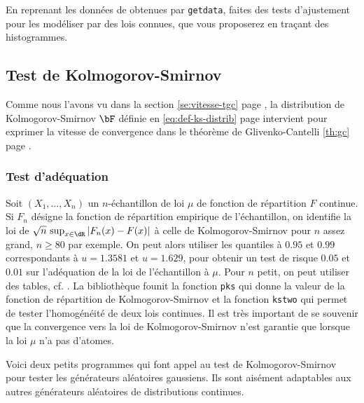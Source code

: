 \begin{exo}
  En reprenant les données de \SB{} obtenues par \texttt{getdata}, faites des
  tests d'ajustement pour les modéliser par des lois connues, que vous
  proposerez en traçant des histogrammes.
\end{exo}


%
\subsection{Test de Kolmogorov-Smirnov}\label{ss:test-ks}
%

Comme nous l'avons vu dans la section \ref{se:vitesse-tgc} page
\pageref{se:vitesse-tgc}, la distribution de Kolmogorov-Smirnov $\bF$ définie
en \eqref{eq:def-ks-distrib} page \pageref{eq:def-ks-distrib} intervient pour
exprimer la vitesse de convergence dans le théorème de Glivenko-Cantelli
\ref{th:gc} page \pageref{th:gc}.

\subsubsection{Test d'adéquation}

Soit $(X_1,\ldots,X_n)$ un $n$-échantillon de loi $\mu$ de fonction de répartition
$F$ continue. Si $F_n$ désigne la fonction de répartition empirique de
l'échantillon, on identifie la loi de $\sqrt{n}\,\sup _{x \in \dR}
|F_n(x)-F(x)|$ à celle de Kolmogorov-Smirnov pour $n$ assez grand, $n \geq 80$
par exemple. On peut alors utiliser les quantiles à $0.95$ et $0.99$
correspondants à $u=1.3581$ et $u=1.629$, pour obtenir un test de risque
$0.05$ et $0.01$ sur l'adéquation de la loi de l'échantillon à $\mu$. Pour $n$
petit, on peut utiliser des tables, cf. \cite{saporta}.  La bibliothèque \SB{}
founit la fonction \texttt{pks} qui donne la valeur de la fonction de
répartition de Kolmogorov-Smirnov et la fonction \texttt{kstwo} qui permet de
tester l'homogénéité de deux lois continues. Il est très important de se
souvenir que la convergence vers la loi de Kolmogorov-Smirnov n'est garantie
que lorsque la loi $\mu$ n'a pas d'atomes.

\begin{exo}
  Voici deux petits programmes \ML{} qui font appel au test de
  Kolmogorov-Smirnov pour tester les générateurs aléatoires gaussiens. Ils
  sont aisément adaptables aux autres générateurs aléatoires de distributions
  continues.
\end{exo}


